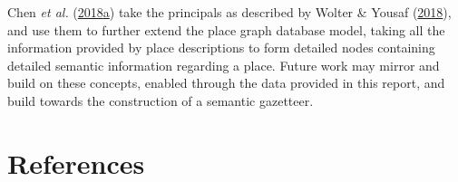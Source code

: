 \documentclass[10pt,]{article}
\begin{document}
Chen \emph{et al.}
(\protect\hyperlink{ref-chen2018a}{2018}\protect\hyperlink{ref-chen2018a}{a})
take the principals as described by Wolter \& Yousaf
(\protect\hyperlink{ref-wolter2018}{2018}), and use them to further
extend the place graph database model, taking all the information
provided by place descriptions to form detailed nodes containing
detailed semantic information regarding a place. Future work may mirror
and build on these concepts, enabled through the data provided in this
report, and build towards the construction of a semantic gazetteer.

\hypertarget{references}{%
\section{References}\label{references}}

\small
\end{document}
